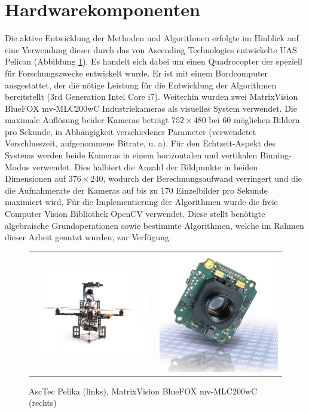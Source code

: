 \section{Hardwarekomponenten}
\label{sec:setup}

Die aktive Entwicklung der Methoden und Algorithmen erfolgte im Hinblick auf eine Verwendung dieser durch das von Ascending Technologies \cite{asctec} entwickelte UAS Pelican (Abbildung \ref{img:pelican}).
Es handelt sich dabei um einen Quadrocopter der speziell für Forschungszwecke entwickelt wurde. Er ist mit einem Bordcomputer ausgestattet, der die nötige Leistung für die Entwicklung der Algorithmen bereitstellt (3rd Generation Intel Core i7). Weiterhin wurden zwei MatrixVision BlueFOX mv-MLC200wC Industriekameras \cite{matrixvision} als visuelles System verwendet. Die maximale Auflösung beider Kameras beträgt $752\times480$ bei 60 möglichen Bildern pro Sekunde, in Abhängigkeit verschiedener Parameter (verwendetet Verschlusszeit, aufgenommene Bitrate, u. a). Für den Echtzeit-Aspekt des Systems werden beide Kameras in einem horizontalen und vertikalen Binning-Modus verwendet. Dies halbiert die Anzahl der Bildpunkte in beiden Dimensionen auf $376\times240$, wodurch der Berechnungsaufwand verringert und die die Aufnahmerate der Kameras auf bis zu 170 Einzelbilder pro Sekunde maximiert wird.
\noindent
Für die Implementierung der Algorithmen wurde die freie Computer Vision Bibliothek OpenCV \cite{opencv} verwendet. Diese stellt benötigte algebraische Grundoperationen sowie bestimmte Algorithmen, welche im Rahmen dieser Arbeit genutzt wurden, zur Verfügung.
\begin{figure}[h]
	\centering
	\begin{tabular}{cc}
	\includegraphics[width=6cm]{img/pelican} &
	\includegraphics[width=6cm]{img/camera}
	\end{tabular}
	\caption{AscTec Pelika (links), MatrixVision BlueFOX mv-MLC200wC (rechts)}
	\label{img:pelican}
\end{figure}


